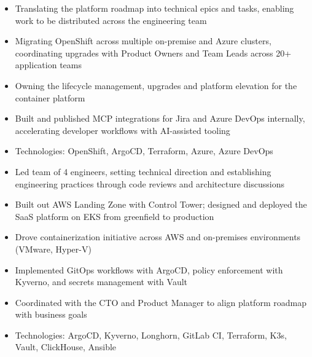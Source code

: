 
\begin{itemize}[leftmargin=*, nosep, after=\vspace{0.05cm}]
    \item Translating the platform roadmap into technical epics and tasks, enabling work to be distributed across the engineering team
    \item Migrating OpenShift across multiple on-premise and Azure clusters, coordinating upgrades with Product Owners and Team Leads across 20+ application teams
    \item Owning the lifecycle management, upgrades and platform elevation for the container platform
    \item Built and published MCP integrations for Jira and Azure DevOps internally, accelerating developer workflows with AI-assisted tooling
    \item Technologies: OpenShift, ArgoCD, Terraform, Azure, Azure DevOps
\end{itemize}

\begin{itemize}[leftmargin=*, nosep, after=\vspace{0.05cm}]
    \item Led team of 4 engineers, setting technical direction and establishing engineering practices through code reviews and architecture discussions
    \item Built out AWS Landing Zone with Control Tower; designed and deployed the SaaS platform on EKS from greenfield to production
    \item Drove containerization initiative across AWS and on-premises environments (VMware, Hyper-V)
    \item Implemented GitOps workflows with ArgoCD, policy enforcement with Kyverno, and secrets management with Vault
    \item Coordinated with the CTO and Product Manager to align platform roadmap with business goals
    \item Technologies: ArgoCD, Kyverno, Longhorn, GitLab CI, Terraform, K3s, Vault, ClickHouse, Ansible
\end{itemize}

